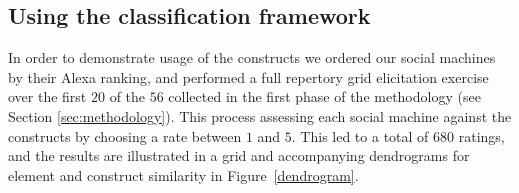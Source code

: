 \documentclass{sig-alternate}
\begin{document}

\subsection{Using the classification framework}
\label{sec:usage}
In order to demonstrate usage of the constructs we ordered our social machines
by their Alexa ranking, and performed a full repertory grid elicitation exercise over the first $20$ of the $56$ collected in the first phase of the methodology (see Section \ref{sec:methodology}). This process assessing each social machine against the constructs by choosing a rate between $1$ and $5$. This led to a total of $680$ ratings, and the
results are illustrated in a grid and accompanying dendrograms for element and construct
similarity in Figure~\ref{dendrogram}.
\end{document}
